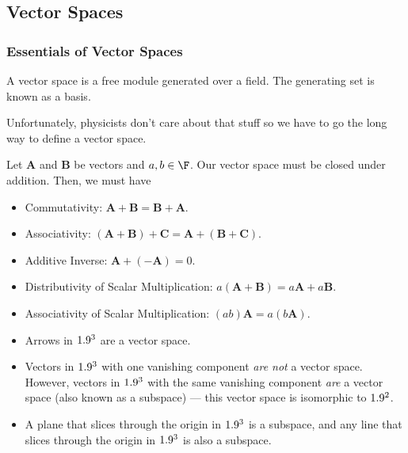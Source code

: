 \documentclass[10pt]{mypackage}
\begin{document}
\subsection{Vector Spaces}%
\subsubsection{Essentials of Vector Spaces}%
A vector space is a free module generated over a field. The generating set is known as a basis.\newline

Unfortunately, physicists don't care about that stuff so we have to go the long way to define a vector space.
\begin{definition}
  Let $\mathbf{A}$ and $\mathbf{B}$ be vectors and $a,b\in \F$. Our vector space must be closed under addition. Then, we must have
  \begin{itemize}
    \item Commutativity: $\mathbf{A} + \mathbf{B} = \mathbf{B} + \mathbf{A}$.
    \item Associativity: $\left(\mathbf{A} + \mathbf{B}\right) + \mathbf{C} = \mathbf{A} + \left(\mathbf{B} + \mathbf{C}\right)$.
    \item Additive Inverse: $\mathbf{A} + \left(-\mathbf{A}\right) = 0$.
    \item Distributivity of Scalar Multiplication: $a\left(\mathbf{A} + \mathbf{B}\right) = a\mathbf{A} + a\mathbf{B}$.
    \item Associativity of Scalar Multiplication: $\left(ab\right)\mathbf{A} = a\left(b\mathbf{A}\right)$.
  \end{itemize}
\end{definition}
\begin{example}[Understanding $\R^3$]
  \begin{itemize}
    \item Arrows in $\R^3$ are a vector space.
    \item Vectors in $\R^3$ with one vanishing component \textit{are not} a vector space. However, vectors in $\R^3$ with the same vanishing component \textit{are} a vector space (also known as a subspace) --- this vector space is isomorphic to $1.9^2$.
    \item A plane that slices through the origin in $\R^3$ is a subspace, and any line that slices through the origin in $\R^3$ is also a subspace.
  \end{itemize}
\end{example}
\end{document}
